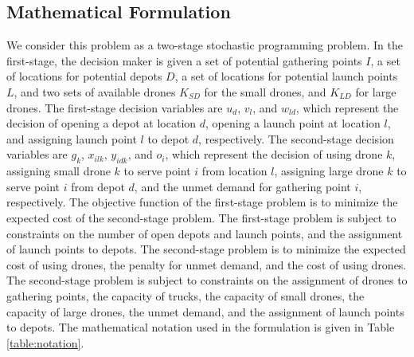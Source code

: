 \documentclass[preprint,review,11pt,authoryear]{elsarticle}
\begin{document}
\subsection{Mathematical Formulation} \label{subsec:MathematicalFormulation}
We consider this problem as a two-stage stochastic programming problem. In the first-stage, the decision maker is given a set of potential gathering points $I$, a set of locations for potential depots $D$, a set of locations for potential launch points $L$, and two sets of available drones $K_{SD}$ for the small drones, and $K_{LD}$ for large drones. The first-stage decision variables are $u_d$, $v_l$, and $w_{ld}$, which represent the decision of opening a depot at location $d$, opening a launch point at location $l$, and assigning launch point $l$ to depot $d$, respectively. The second-stage decision variables are $g_k$, $x_{ilk}$, $y_{idk}$, and $o_i$, which represent the decision of using drone $k$, assigning small drone $k$ to serve point $i$ from location $l$, assigning large drone $k$ to serve point $i$ from depot $d$, and the unmet demand for gathering point $i$, respectively. The objective function of the first-stage problem is to minimize the expected cost of the second-stage problem. The first-stage problem is subject to constraints on the number of open depots and launch points, and the assignment of launch points to depots. The second-stage problem is to minimize the expected cost of using drones, the penalty for unmet demand, and the cost of using drones. The second-stage problem is subject to constraints on the assignment of drones to gathering points, the capacity of trucks, the capacity of small drones, the capacity of large drones, the unmet demand, and the assignment of launch points to depots. The mathematical notation used in the formulation is given in Table \ref{table:notation}. 
\end{document}
